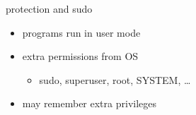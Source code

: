 \begin{frame}{protection and sudo}
\begin{itemize}
    \item programs  run in user mode
    \item extra permissions from OS 
        \begin{itemize}
        \item sudo, superuser, root, SYSTEM, \ldots
        \end{itemize}
    \item {} may remember extra privileges
\end{itemize}
\end{frame}
